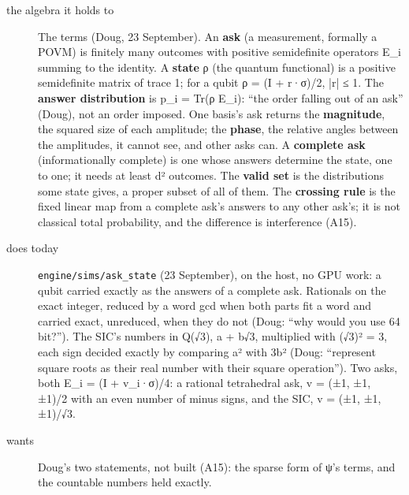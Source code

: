 \begin{description}
\item[{the algebra it holds to}] The terms (Doug, 23 September). An \textbf{ask} (a measurement, formally a POVM) is finitely many outcomes with positive semidefinite operators E\_\allowbreak{}i summing to the identity. A \textbf{state} ρ (the quantum functional) is a positive semidefinite matrix of trace 1; for a qubit ρ = (I + r·σ)/2, |r| ≤ 1. The \textbf{answer distribution} is p\_\allowbreak{}i = Tr(ρ E\_\allowbreak{}i): “the order falling out of an ask” (Doug), not an order imposed. One basis's ask returns the \textbf{magnitude}, the squared size of each amplitude; the \textbf{phase}, the relative angles between the amplitudes, it cannot see, and other asks can. A \textbf{complete ask} (informationally complete) is one whose answers determine the state, one to one; it needs at least d² outcomes. The \textbf{valid set} is the distributions some state gives, a proper subset of all of them. The \textbf{crossing rule} is the fixed linear map from a complete ask's answers to any other ask's; it is not classical total probability, and the difference is interference (A15).
\item[{does today}] \texttt{engine/\allowbreak{}sims/\allowbreak{}ask\_\allowbreak{}state} (23 September), on the host, no GPU work: a qubit carried exactly as the answers of a complete ask. Rationals on the exact integer, reduced by a word gcd when both parts fit a word and carried exact, unreduced, when they do not (Doug: “why would you use 64 bit?”). The SIC's numbers in Q(√3), a + b√3, multiplied with (√3)² = 3, each sign decided exactly by comparing a² with 3b² (Doug: “represent square roots as their real number with their square operation”). Two asks, both E\_\allowbreak{}i = (I + v\_\allowbreak{}i·σ)/4: a rational tetrahedral ask, v = (±1, ±1, ±1)/2 with an even number of minus signs, and the SIC, v = (±1, ±1, ±1)/√3.
\item[{wants}] Doug's two statements, not built (A15): the sparse form of ψ's terms, and the countable numbers held exactly.

\end{description}
